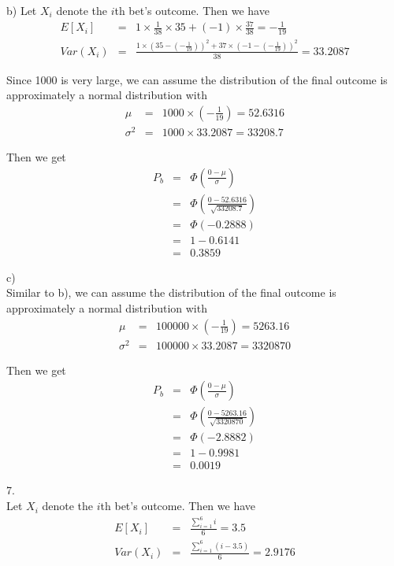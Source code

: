 \documentclass[12pt]{article}
\begin{document}
b) Let $X_i$ denote the $i$th bet's outcome. Then we have
\begin{eqnarray*}
  E[X_i] &=& 1 \times \frac{1}{38} \times 35 + (-1) \times \frac{37}{38}
  = - \frac{1}{19} \\
  Var(X_i)
  &=& \frac{1 \times (35 - (- \frac{1}{19}))^2
    + 37 \times (-1 - (- \frac{1}{19}))^2} {38}
  = 33.2087
\end{eqnarray*}

Since 1000 is very large, we can assume the distribution of the final outcome is approximately a normal distribution with
\begin{eqnarray*}
  \mu &=& 1000 \times (- \frac{1}{19}) = 52.6316 \\
  \sigma^2 &=& 1000 \times 33.2087 = 33208.7
\end{eqnarray*}

Then we get
\begin{eqnarray*}
  P_b
  &=& \Phi \left( \frac{0 - \mu}{\sigma} \right) \\
  &=& \Phi \left( \frac{0 - 52.6316}{\sqrt {33208.7}} \right) \\
  &=& \Phi \left( -0.2888 \right) \\
  &=& 1 - 0.6141 \\
  &=& 0.3859
\end{eqnarray*}

c) \\
Similar to b), we can assume the distribution of the final outcome is approximately a normal distribution with
\begin{eqnarray*}
  \mu &=& 100000 \times (- \frac{1}{19}) = 5263.16 \\
  \sigma^2 &=& 100000 \times 33.2087 = 3320870
\end{eqnarray*}

Then we get
\begin{eqnarray*}
  P_b
  &=& \Phi \left( \frac{0 - \mu}{\sigma} \right) \\
  &=& \Phi \left( \frac{0 - 5263.16}{\sqrt {3320870}} \right) \\
  &=& \Phi \left( -2.8882 \right) \\
  &=& 1 - 0.9981 \\
  &=& 0.0019
\end{eqnarray*}

7. \\

Let $X_i$ denote the $i$th bet's outcome. Then we have
\begin{eqnarray*}
  E[X_i] &=& \frac{\sum_{i=1}^6 i} {6} = 3.5 \\
  Var(X_i) &=& \frac{\sum_{i=1}^6 (i - 3.5)}{6} = 2.9176
\end{eqnarray*}
\end{document}

